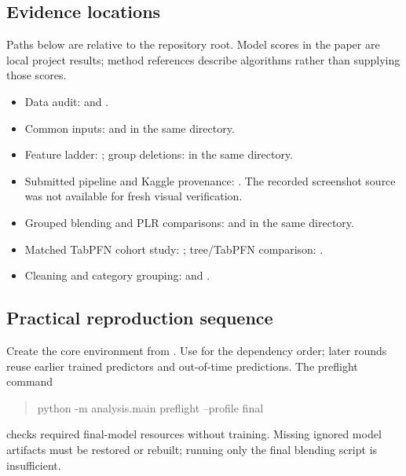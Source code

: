 \documentclass[conference]{IEEEtran}
\begin{document}
\subsection{Evidence locations}
Paths below are relative to the repository root. Model scores in the paper are local project results; method references describe algorithms rather than supplying those scores.
\begin{itemize}
\item Data audit:  and .
\item Common inputs:  and  in the same directory.
\item Feature ladder: ; group deletions:  in the same directory.
\item Submitted pipeline and Kaggle provenance: . The recorded screenshot source was not available for fresh visual verification.
\item Grouped blending and PLR comparisons:  and  in the same directory.
\item Matched TabPFN cohort study: ; tree/TabPFN comparison: .
\item Cleaning and category grouping:  and .
\end{itemize}

\subsection{Practical reproduction sequence}
Create the core environment from . Use  for the dependency order; later rounds reuse earlier trained predictors and out-of-time predictions. The preflight command
\begin{quote}\small\ttfamily
python -m analysis.main preflight --profile final
\end{quote}
checks required final-model resources without training. Missing ignored model artifacts must be restored or rebuilt; running only the final blending script is insufficient.
\end{document}
